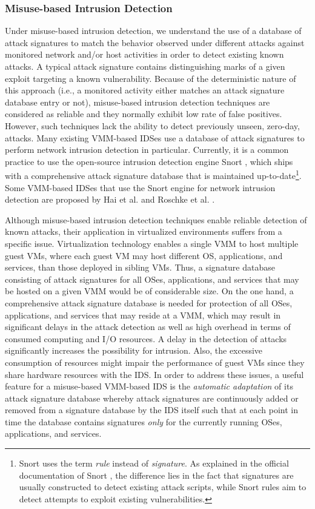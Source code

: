 \subsubsection{Misuse-based Intrusion Detection}
\label{sec:misuse_based}

Under misuse-based intrusion detection, we understand the use of a database of attack signatures to match the behavior observed under different attacks against monitored network and/or host activities in order to detect existing known attacks. A typical attack signature contains distinguishing marks of a given exploit targeting a known vulnerability. Because of the deterministic nature of this approach (i.e., a monitored activity either matches an attack signature database entry or not), misuse-based intrusion detection techniques are considered as reliable and they normally exhibit low rate of false positives. However, such techniques lack the ability to detect previously unseen, zero-day, attacks. Many existing VMM-based IDSes use a database of attack signatures to perform network intrusion detection in particular. Currently, it is a common practice to use the open-source intrusion detection engine Snort \cite{roesch:snort}, which ships with a comprehensive attack signature database that is maintained up-to-date\footnote{Snort uses the term \emph{rule} instead of \emph{signature}. As explained in the official documentation of Snort \cite{snortdoc}, the difference lies in the fact that signatures are usually constructed to detect existing attack scripts, while Snort rules aim to detect attempts to exploit existing vulnerabilities.}. Some VMM-based IDSes that use the Snort engine for network intrusion detection are proposed by Hai et al. \cite{hai:vmfence} and Roschke et al. \cite{roschke:intrusion}.  

Although misuse-based intrusion detection techniques enable reliable detection of known attacks, their application in virtualized environments suffers from a specific issue. Virtualization technology enables a single VMM to host multiple guest VMs, where each guest VM may host different OS, applications, and services, than those deployed in sibling VMs. Thus, a signature database consisting of attack signatures for all OSes, applications, and services that may be hosted on a given VMM would be of considerable size. On the one hand, a comprehensive attack signature database is needed for protection of all OSes, applications, and services that may reside at a VMM, which may result in significant delays in the attack detection as well as high overhead in terms of consumed computing and I/O resources. A delay in the detection of attacks significantly increases the possibility for intrusion. Also, the excessive consumption of resources might impair the performance of guest VMs since they share hardware resources with the IDS. In order to address these issues, a useful feature for a misuse-based VMM-based IDS is the \emph{automatic adaptation} of its attack signature database whereby attack signatures are continuously added or removed from a signature database by the IDS itself such that at each point in time the database contains signatures \emph{only} for the currently running OSes, applications, and services. 

